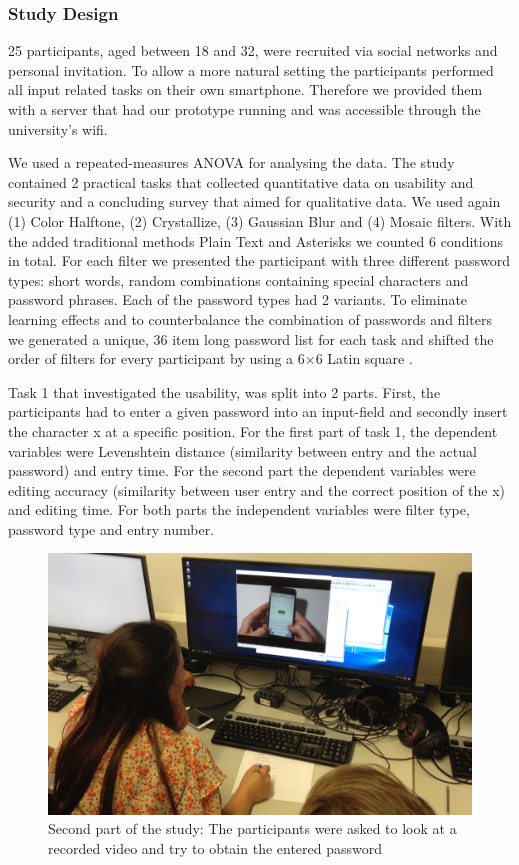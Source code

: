 \documentclass{sigchi}
\begin{document}
\subsubsection{Study Design}
25 participants, aged between 18 and 32, were recruited via social networks and personal invitation. To allow a more natural setting the participants performed all input related tasks on their own smartphone. Therefore we provided them with a server that had our prototype running and was accessible through the university's wifi.

We used a repeated-measures ANOVA for analysing the data. The study contained 2 practical tasks that collected quantitative data on usability and security and a concluding survey that aimed for qualitative data. 
We used again (1) Color Halftone, (2) Crystallize, (3) Gaussian Blur and (4) Mosaic filters. With the added traditional methods Plain Text and Asterisks we counted 6 conditions in total. For each filter we presented the participant with three different password types: short words, random combinations containing special characters and password phrases. Each of the password types had 2 variants. To eliminate learning effects and to counterbalance the combination of passwords and filters we generated a unique, 36 item long password list for each task and shifted the order of filters for every participant by using a 6$\times$6 Latin square \cite{williams1949experimental}.

Task 1 that investigated the usability, was split into 2 parts. First, the participants had to enter a given password into an input-field and secondly insert the character x at a specific position. For the first part of task 1, the dependent variables were Levenshtein distance (similarity between entry and the actual password) \cite{damerau1964technique, levenshtein1966binary} and entry time. For the second part the dependent variables were editing accuracy (similarity between user entry and the correct position of the x) and editing time. For both parts the independent variables were filter type, password type and entry number.

\begin{figure}[h]
    \centering
    \includegraphics[width=\columnwidth]{figures/studie.jpg}
    \caption{Second part of the study: The participants were asked to look at a recorded video and try to obtain the entered password}
    \label{fig:study}
    \vspace{-1mm}
\end{figure}
\end{document}
